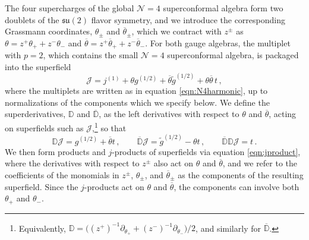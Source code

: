 \documentclass[12pt]{article}
\numberwithin{equation}{section}
\numberwithin{figure}{section}
\theoremstyle{plain}
\theoremstyle{definition}
\begin{document}
The four supercharges of the global $\mathcal{N}=4$ superconformal algebra form two doublets of the $\mathfrak{su}(2)$ flavor symmetry, and we introduce the corresponding Grassmann coordinates, $\theta_\pm$ and $\overline{\theta}_\pm$, which we contract with $z^\pm$ as $\theta = z^+ \theta_+ + z^- \theta_-$ and $\overline{\theta} = z^+ \overline{\theta}_+ + z^- \overline{\theta}_-$. For both gauge algebras, the multiplet with $p = 2$, which contains the small $\mathcal{N}=4$ superconformal algebra, is packaged into the superfield
\begin{equation}\label{eqn:N4J}
    \mathcal{J} = j^{(1)} + \theta g^{(1/2)} + \overline{\theta} \widetilde{g}^{(1/2)} + \theta \overline{\theta} \, t \,,
\end{equation}
where the multiplets are written as in equation \eqref{eqn:N4harmonic}, up to normalizations of the components which we specify below. We define the superderivatives, $\mathbb{D}$ and $\overline{\mathbb{D}}$, as the left derivatives with respect to $\theta$ and $\overline{\theta}$, acting on superfields such as $\mathcal{J}$,\footnote{Equivalently, $\mathbb{D} = \big( (z^+)^{-1} \partial_{\theta_+} + (z^-)^{-1} \partial_{\theta_-} \big) / 2$, and similarly for $\overline{\mathbb{D}}$.} so that
\begin{equation}
    \mathbb{D}\mathcal{J} = g^{(1/2)} + \overline{\theta} t \,, \qquad \overline{\mathbb{D}}\mathcal{J} = \widetilde{g}^{(1/2)} - \theta t \,, \qquad \overline{\mathbb{D}}\mathbb{D}\mathcal{J} = t \,.
\end{equation}
We then form products and $j$-products of superfields via equation \eqref{eqn:jproduct}, where the derivatives with respect to $z^\pm$ also act on $\theta$ and $\overline{\theta}$, and we refer to the coefficients of the monomials in $z^\pm$, $\theta_\pm$, and $\overline{\theta}_\pm$ as the components of the resulting superfield. Since the $j$-products act on $\theta$ and $\overline{\theta}$, the components can involve both $\theta_+$ and $\theta_-$.
\end{document}
